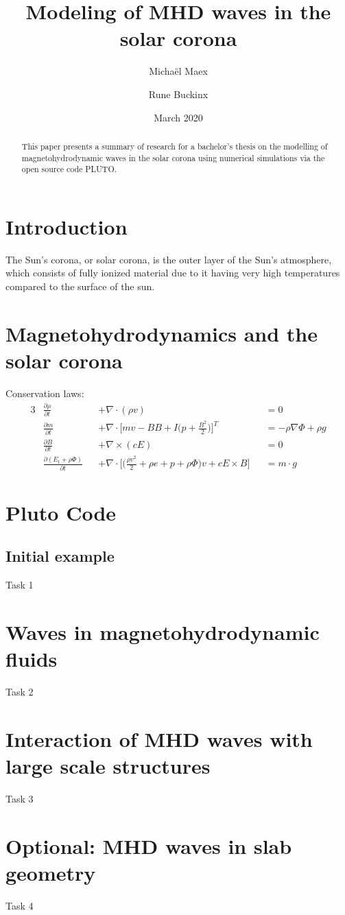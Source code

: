 \documentclass[11pt]{article}
\title{Modeling of MHD waves in the solar corona}
\author{Micha\"el Maex \and Rune Buckinx}
\date{March 2020}
\begin{document}
\maketitle

\begin{abstract}
    This paper presents a summary of research for a bachelor's thesis on the modelling of magnetohydrodynamic waves in the solar corona using numerical simulations via the open source code PLUTO. 
\end{abstract}
\tableofcontents
\newpage
\section{Introduction}
The Sun's corona, or solar corona, is the outer layer of the Sun's atmosphere, which consists of fully ionized material due to it having very high temperatures compared to the surface of the sun. 
\section{Magnetohydrodynamics and the solar corona}
Conservation laws:
\begin{alignat}{3}
    &\frac{\partial \rho}{\partial t} &&+ \nabla \cdot (\rho v) &&= 0\label{masscont}\\
    &\frac{\partial m}{\partial t} &&+  \nabla \cdot \bigg[mv - BB+ I\bigg(p + \frac{B^2}{2}\bigg)\bigg]^T &&= -\rho \nabla \Phi + \rho g\label{cauchymoment}\\
    &\frac{\partial B}{\partial t} &&+ \nabla \times (cE) &&= 0\label{Faraday}\\
    &\frac{\partial(E_t + \rho \Phi)}{\partial t} &&+ \nabla \cdot \bigg[\bigg(\frac{\rho v^2}{2} + \rho e + p + \rho \Phi\bigg)v + cE \times B\bigg] &&= m \cdot g \label{energy}
\end{alignat}

\section{Pluto Code}
\subsection{Initial example}
Task 1
\section{Waves in magnetohydrodynamic fluids}
Task 2
\section{Interaction of MHD waves with large scale structures}
Task 3
\section{Optional: MHD waves in slab geometry}
Task 4
\end{document}
